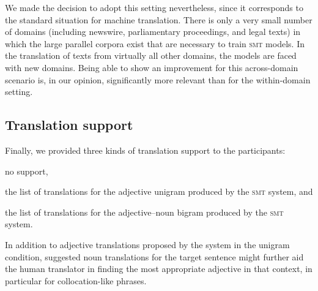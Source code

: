 \documentclass[output=paper]{LSP/langsci}
\begin{document}
We made the decision to adopt this setting nevertheless, since it
corresponds to the standard situation for machine translation. There
is only a very small number of domains (including newswire,
parliamentary proceedings, and legal texts) in which the large
parallel corpora exist that are necessary to train \textsc{smt}
models. In the translation of texts from virtually all other domains,
the models are faced with new domains. Being able to show an
improvement for this across-domain scenario is, in our opinion,
significantly more relevant than for the within-domain setting.



\subsection{Translation support}
\label{sec:kremer:trans-support}

Finally, we provided three kinds of translation support to the participants:
\begin{inparaenum}[(a)]
\item no support,
\item the list of translations for the adjective unigram produced by
  the \textsc{smt} system, and
\item the list of translations for the adjective--noun bigram produced
  by the \textsc{smt} system.
\end{inparaenum}
In addition to adjective translations proposed by the system in the
unigram condition, suggested noun translations for the target sentence
might further aid the human translator in finding the most appropriate
adjective in that context, in particular for collocation-like phrases.

\end{document}
